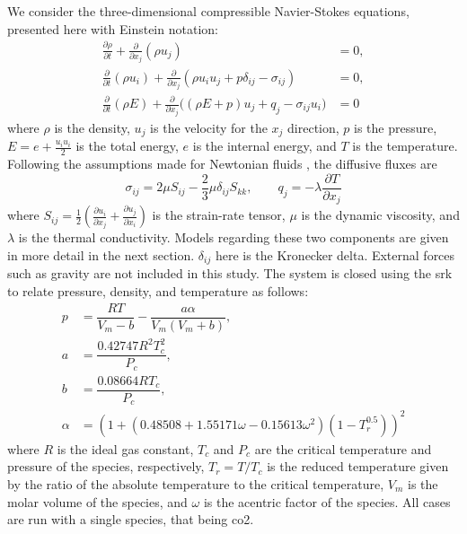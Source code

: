 We consider the three-dimensional compressible Navier-Stokes equations, presented here with Einstein notation:
\begin{subequations} \label{NSE_einstein}
\begin{align}
  \frac{\partial\rho}{\partial t} + \frac{\partial }{\partial x_j} \left( \rho u_j \right) &= 0,  \label{NSE_mass}\\
  \frac{\partial}{\partial t} \left( \rho u_i \right) + \frac{\partial}{\partial x_j} \left(\rho u_i u_j + p \delta_{ij} -\sigma_{ij} \right) &= 0,  \label{NSE_mom}\\
  \frac{\partial}{\partial t} \left( \rho E \right) + \frac{\partial}{\partial x_j} \big(\left( \rho E+p \right) u_j + q_j - \sigma_{ij} u_i\big) &= 0 \label{NSE_E}
\end{align}
\end{subequations}
where $\rho$ is the density, $u_j$ is the velocity for the $x_j$ direction, $p$ is the pressure, $E = e + \frac{u_i u_i}{2}$ is the total energy, $e $ is the internal energy, and $T$ is the temperature. Following the assumptions made for Newtonian fluids \cite{batchelor_2000}, the diffusive fluxes are
\begin{equation} \label{Transport}
  \sigma_{ij} = 2\mu S_{ij} - \frac{2}{3}\mu \delta_{ij} S_{kk}, \quad \quad
  q_j = -\lambda \frac{\partial T}{\partial x_j}
\end{equation}
where
$S_{ij} = \frac{1}{2}\left(\frac{\partial u_i}{\partial x_j} + \frac{\partial u_j}{\partial x_i} \right)$ is the strain-rate tensor, $\mu$ is the dynamic viscosity, and $\lambda$ is the thermal conductivity. Models regarding these two components are given in more detail in the next section. $\delta_{ij}$ here is the Kronecker delta. External forces such as gravity are not included in this study. The system is closed using the \gls{srk} \cite{SOAVE1972} to relate pressure, density, and temperature as follows:
\begin{equation} \label{SRK_eos}
\begin{aligned} 
	p &= \dfrac{RT}{V_m - b} - \dfrac{a \alpha}{V_m(V_m + b)}, \\
	a &= \dfrac{0.42747R^2T_c^2}{P_c}, \\
	b &= \dfrac{0.08664RT_c}{P_c}, \\
	\alpha &= \left( 1 + \left( 0.48508 + 1.55171 \omega - 0.15613 \omega^2 \right)\left( 1 - T_r^{0.5} \right) \right)^2
\end{aligned}
\end{equation}
where $R$ is the ideal gas constant, $T_c$ and $P_c$ are the critical temperature and pressure of the species, respectively, $T_r = T/T_c$ is the reduced temperature given by the ratio of the absolute temperature to the critical temperature, $V_m$ is the molar volume of the species, and $\omega$ is the acentric factor of the species. All cases are run with a single species, that being \gls{co2}. 

